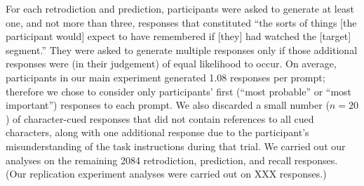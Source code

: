 \documentclass[10pt]{article}
\begin{document}
For each retrodiction and prediction, participants were asked to generate at least one, and not more than three, responses that constituted ``the sorts of things [the participant would] expect to have remembered if [they] had watched the [target] segment.'' They were asked to generate multiple responses only if those additional responses were (in their judgement) of equal likelihood to occur. On average, participants in our main experiment generated 1.08 responses per prompt; therefore we chose to consider only participants' first (``most probable'' or ``most important'') responses to each prompt. We also discarded a small number ($n = 20$) of character-cued responses that did not contain references to all cued characters, along with one additional response due to the participant's misunderstanding of the task instructions during that trial. We carried out our analyses on the remaining 2084 retrodiction, prediction, and recall responses. (Our replication experiment analyses were carried out on XXX responses.)
\end{document}
